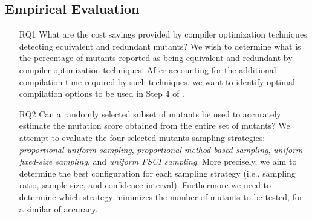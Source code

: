 


\subsection{Empirical Evaluation}
\label{sec:evaluation}

\STARTCHANGEDNOV



\begin{itemize}

    \item[RQ1] What are the cost savings provided by compiler optimization techniques detecting equivalent and redundant mutants?
    We wish to determine what is the percentage of mutants reported as being equivalent and redundant by compiler optimization techniques. After accounting for the additional compilation time required by such techniques, we want to identify optimal compilation options to be used in Step 4 of \APPR.

    \item[RQ2] Can a randomly selected subset of mutants be used to accurately estimate the mutation score obtained from the entire set of mutants? 
     {We attempt to evaluate the four selected mutants sampling strategies: \emph{proportional uniform sampling}, \emph{proportional method-based sampling},  \emph{uniform fixed-size sampling}, and \emph{uniform FSCI sampling}. More precisely, we aim to determine the best configuration for each sampling strategy (i.e., sampling ratio, sample size, and confidence interval). Furthermore we need to determine which strategy minimizes the number of mutants to be tested, for a similar of accuracy.}




\end{itemize}
